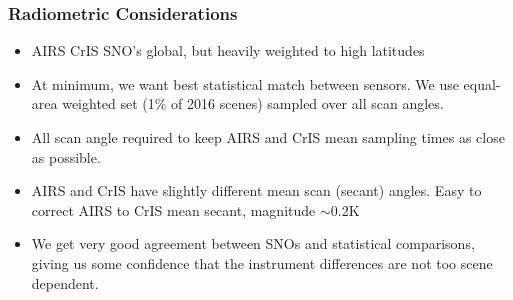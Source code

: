 \documentclass[10pt,t]{beamer}
\begin{document}
\begin{frame}
  \frametitle{Radiometric Considerations}
  \begin{itemize}
    \item AIRS CrIS SNO's global, but heavily weighted to high latitudes
    \item At minimum, we want best statistical match between sensors.  We use equal-area weighted set (1\% of 2016 scenes) sampled over all scan angles.
    \item All scan angle required to keep AIRS and CrIS mean sampling times as close as possible.
    \item AIRS and CrIS have slightly different mean scan (secant) angles.  Easy to correct AIRS to CrIS mean secant, magnitude $\sim$0.2K
  \item We get very good agreement between SNOs and statistical comparisons, giving us some confidence that the instrument differences are not too scene dependent.
  \end{itemize}
  
\end{frame}
\end{document}
